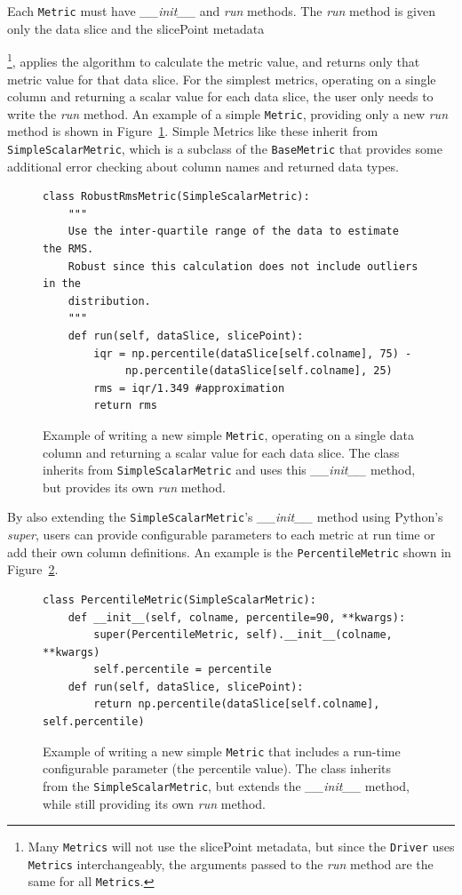 \documentclass[]{spie}  %
\begin{document}
Each {\tt Metric} must have {\it \_\_init\_\_} and {\it run} methods. The
{\it run} method is given only the data slice and the slicePoint
metadata{\footnote{Many {\tt Metrics} will not use the slicePoint
    metadata, but since the {\tt Driver} uses 
    {\tt Metrics} interchangeably, the arguments passed to the {\it
      run} method are the same for all {\tt Metrics}.}, applies the algorithm
to calculate the metric value, and returns only that metric value for
that data slice. For the simplest metrics,
operating on a single column and returning a scalar value for each
data slice, the user only needs to write the {\it run} method.  An
example of a simple {\tt Metric}, providing only a new {\it run} method is
shown in Figure~\ref{fig:simplemetric}. Simple Metrics like these
inherit from {\tt SimpleScalarMetric}, which is a subclass of the {\tt BaseMetric}
that provides some additional error checking about column names and
returned data types.

\begin{figure}
\centering
\begin{lstlisting}[frame=single]
class RobustRmsMetric(SimpleScalarMetric):
    """
    Use the inter-quartile range of the data to estimate the RMS.  
    Robust since this calculation does not include outliers in the
    distribution.
    """
    def run(self, dataSlice, slicePoint):
        iqr = np.percentile(dataSlice[self.colname], 75) - 
             np.percentile(dataSlice[self.colname], 25)
        rms = iqr/1.349 #approximation
        return rms
\end{lstlisting}
\caption[]
{ \label{fig:simplemetric} Example of writing a new simple {\tt Metric},
  operating on a single data column and returning a scalar value for
  each data slice. The class inherits from {\tt SimpleScalarMetric} and uses
  this {\it \_\_init\_\_} method, but provides its own {\it run}
  method. }
\end{figure}

By also extending the {\tt SimpleScalarMetric}'s {\it \_\_init\_\_} method using Python's {\it super}, users can provide
configurable parameters to each metric at run time or add their own
column definitions. An example is the {\tt PercentileMetric} shown in
Figure~\ref{fig:simpleconfigurablemetric}. 

\begin{figure}
\begin{lstlisting}[frame=single]
class PercentileMetric(SimpleScalarMetric):
    def __init__(self, colname, percentile=90, **kwargs):
        super(PercentileMetric, self).__init__(colname, **kwargs)
        self.percentile = percentile
    def run(self, dataSlice, slicePoint):
        return np.percentile(dataSlice[self.colname], self.percentile)
\end{lstlisting}
\caption[]
{\label{fig:simpleconfigurablemetric} Example of writing a new simple
  {\tt Metric} that includes a run-time configurable parameter (the
  percentile value). The class inherits from the {\tt SimpleScalarMetric},
  but extends the {\it \_\_init\_\_} method, while still providing its
  own {\it run} method.}
\end{figure}

}
\end{document}

